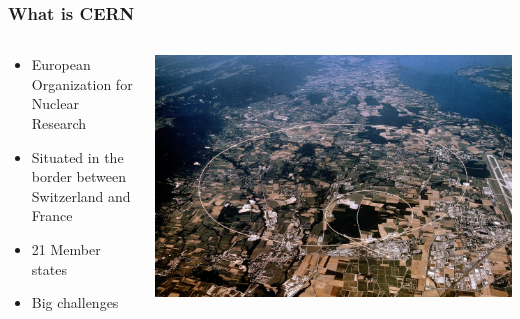 \documentclass{beamer}
\begin{document}
\begin{frame}

    \frametitle{What is CERN}
    \begin{minipage}[t]{0.95\textwidth}
        \begin{columns}
            \begin{column}{0.5\textwidth}
                \begin{itemize}
                    \item European Organization for Nuclear Research
                    \item Situated in the border between Switzerland and France
                    \item 21 Member states
                    \item Big challenges 
                \end{itemize}
            \end{column}
            \begin{column}{0.5\textwidth}
                \includegraphics[width=1.1\textwidth]{CernMap.jpg}
            \end{column}
        \end{columns}
    \end{minipage}

\end{frame}

\end{document}
